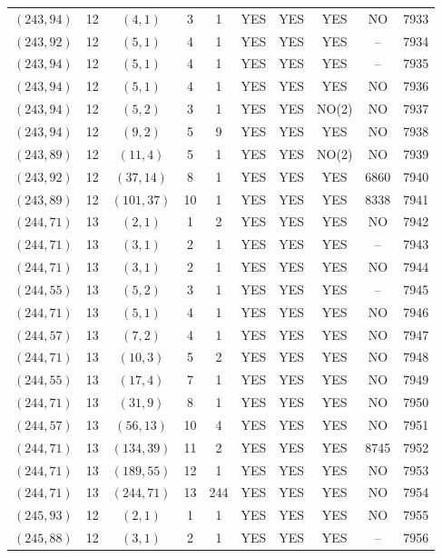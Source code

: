 \begin{longtable}{|c|c|c|c|c|c|c|c|c|c|}
$(243, 94)$ & 12 & $(4, 1)$ & 3 & 1 & YES & YES & YES & NO & 7933\\
$(243, 92)$ & 12 & $(5, 1)$ & 4 & 1 & YES & YES & YES & -- & 7934\\
$(243, 94)$ & 12 & $(5, 1)$ & 4 & 1 & YES & YES & YES & -- & 7935\\
$(243, 94)$ & 12 & $(5, 1)$ & 4 & 1 & YES & YES & YES & NO & 7936\\
$(243, 94)$ & 12 & $(5, 2)$ & 3 & 1 & YES & YES & NO(2) & NO & 7937\\
$(243, 94)$ & 12 & $(9, 2)$ & 5 & 9 & YES & YES & YES & NO & 7938\\
$(243, 89)$ & 12 & $(11, 4)$ & 5 & 1 & YES & YES & NO(2) & NO & 7939\\
$(243, 92)$ & 12 & $(37, 14)$ & 8 & 1 & YES & YES & YES & 6860 & 7940\\
$(243, 89)$ & 12 & $(101, 37)$ & 10 & 1 & YES & YES & YES & 8338 & 7941\\
$(244, 71)$ & 13 & $(2, 1)$ & 1 & 2 & YES & YES & YES & NO & 7942\\
$(244, 71)$ & 13 & $(3, 1)$ & 2 & 1 & YES & YES & YES & -- & 7943\\
$(244, 71)$ & 13 & $(3, 1)$ & 2 & 1 & YES & YES & YES & NO & 7944\\
$(244, 55)$ & 13 & $(5, 2)$ & 3 & 1 & YES & YES & YES & -- & 7945\\
$(244, 71)$ & 13 & $(5, 1)$ & 4 & 1 & YES & YES & YES & NO & 7946\\
$(244, 57)$ & 13 & $(7, 2)$ & 4 & 1 & YES & YES & YES & NO & 7947\\
$(244, 71)$ & 13 & $(10, 3)$ & 5 & 2 & YES & YES & YES & NO & 7948\\
$(244, 55)$ & 13 & $(17, 4)$ & 7 & 1 & YES & YES & YES & NO & 7949\\
$(244, 71)$ & 13 & $(31, 9)$ & 8 & 1 & YES & YES & YES & NO & 7950\\
$(244, 57)$ & 13 & $(56, 13)$ & 10 & 4 & YES & YES & YES & NO & 7951\\
$(244, 71)$ & 13 & $(134, 39)$ & 11 & 2 & YES & YES & YES & 8745 & 7952\\
$(244, 71)$ & 13 & $(189, 55)$ & 12 & 1 & YES & YES & YES & NO & 7953\\
$(244, 71)$ & 13 & $(244, 71)$ & 13 & 244 & YES & YES & YES & NO & 7954\\
$(245, 93)$ & 12 & $(2, 1)$ & 1 & 1 & YES & YES & YES & NO & 7955\\
$(245, 88)$ & 12 & $(3, 1)$ & 2 & 1 & YES & YES & YES & -- & 7956\\

\end{longtable}
